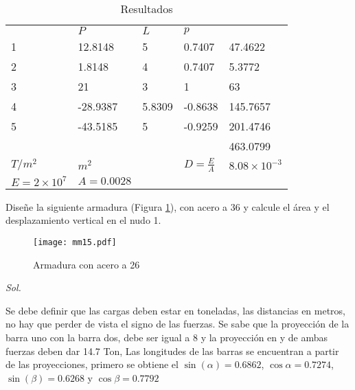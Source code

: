 \begin{table}[h!]
  \centering
  \begin{tabular}{lllll}
                   & $P$        & $L$    & $p$             &                      \\
  1                & 12.8148    & 5      & 0.7407          & 47.4622              \\
  2                & 1.8148     & 4      & 0.7407          & 5.3772               \\
  3                & 21         & 3      & 1               & 63                   \\
  4                & -28.9387   & 5.8309 & -0.8638         & 145.7657             \\
  5                & -43.5185   & 5      & -0.9259         & 201.4746             \\
                   &            &        &                 & 463.0799             \\
  $T/m^2$          & $m^2$      &        & $D=\frac{E}{A}$ & $8.08\times 10^{-3}$ \\
  $E=2\times 10^7$ & $A=0.0028$ &        &                 &                     
  \end{tabular}
  \caption{Resultados}
  \label{tabmm3}
\end{table}
\begin{example}
  Diseñe la siguiente armadura (Figura \ref{mm15}), con acero a 36 y calcule el área y el desplazamiento vertical en el nudo 1.
\end{example}
\begin{figure}[h!]
\centering
\texttt{[image: mm15.pdf]}
\caption{Armadura con acero a 26}
\label{mm15}
\end{figure}
\textit{ Sol. }

Se debe definir que las cargas deben estar en toneladas, las distancias en metros, no hay que perder de vista el signo de las fuerzas.
Se sabe que la proyección de la barra uno con la barra dos, debe ser igual a 8 y la proyección en y de ambas fuerzas deben dar 14.7 Ton,
Las longitudes de las barras se encuentran a partir de las proyecciones, primero se obtiene el $\sin{(\alpha)=0.6862}$, $\cos{\alpha}=0.7274$, $\sin{(\beta)}=0.6268$ y $\cos{\beta}=0.7792$

